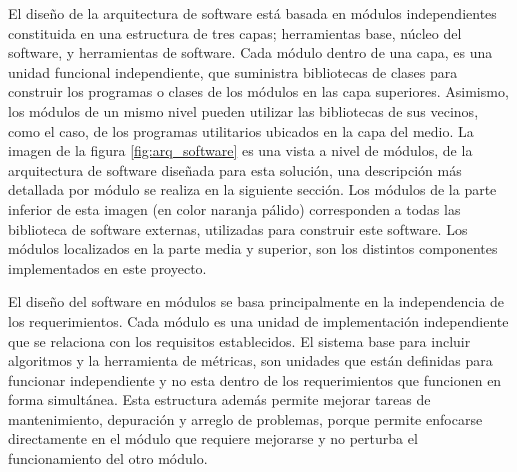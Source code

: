 El diseño de la arquitectura de software está basada en módulos independientes constituida en una estructura de tres capas; herramientas base, núcleo del software, y herramientas de software. Cada módulo dentro de una capa, es una unidad funcional independiente, que suministra bibliotecas de clases para construir los programas o clases de los módulos en las capa superiores. Asimismo, los módulos de un mismo nivel pueden utilizar las bibliotecas de sus vecinos, como el caso, de los programas utilitarios ubicados en la capa del medio. La imagen de la figura \ref{fig:arq_software} es una vista a nivel de módulos, de la arquitectura de software diseñada para esta solución, una descripción más detallada por módulo se realiza en la siguiente sección. Los módulos de la parte inferior de esta imagen (en color naranja pálido) corresponden a todas las biblioteca de software externas, utilizadas para construir este software. Los módulos localizados en la parte media y superior, son los distintos componentes implementados en este proyecto. 

El diseño del software en módulos se basa principalmente en la independencia de los requerimientos. Cada módulo es una unidad de implementación independiente que se relaciona con los requisitos establecidos. El sistema base para incluir algoritmos y la herramienta de métricas, son unidades que están definidas para funcionar independiente y no esta dentro de los requerimientos que funcionen en forma simultánea. Esta estructura además permite mejorar tareas de mantenimiento, depuración y arreglo de problemas, porque permite enfocarse directamente en el módulo que requiere mejorarse y no perturba el funcionamiento del otro módulo.
 

